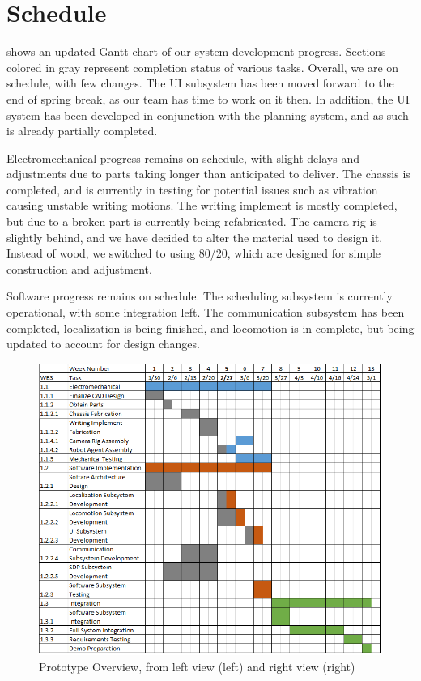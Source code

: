 
\section{Schedule}
\label{sec:schedule}

 shows an updated Gantt chart of our system development progress. Sections colored in gray represent completion status of various tasks. Overall, we are on schedule, with few changes. The UI subsystem has been moved forward to the end of spring break, as our team has time to work on it then. In addition, the UI system has been developed in conjunction with the planning system, and as such is already partially completed.

Electromechanical progress remains on schedule, with slight delays and adjustments due to parts taking longer than anticipated to deliver. The chassis is completed, and is currently in testing for potential issues such as vibration causing unstable writing motions. The writing implement is mostly completed, but due to a broken part is currently being refabricated. The camera rig is slightly behind, and we have decided to alter the material used to design it. Instead of wood, we switched to using 80/20, which are designed for simple construction and adjustment.

Software progress remains on schedule. The scheduling subsystem is currently operational, with some integration left. The communication subsystem has been completed, localization is being finished, and locomotion is in complete, but being updated to account for design changes.

\begin{figure}[h!]
\centering
\includegraphics[width=0.49\columnwidth]{figs/gantt_chart_3_1_17.png}
\caption{Prototype Overview, from left view (left) and right view (right)}
\label{fig:gantt_3_7}
\end{figure}
